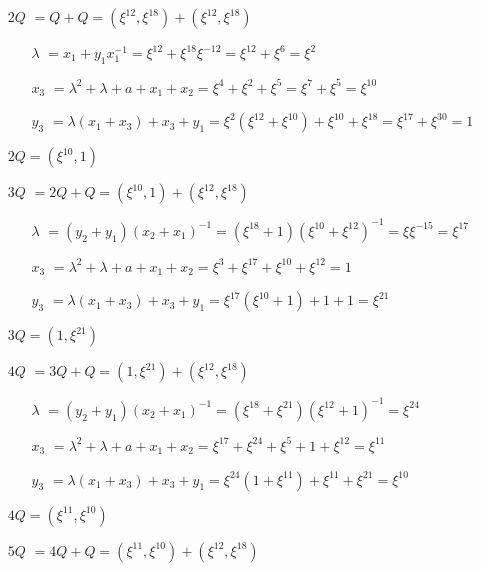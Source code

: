 \documentclass[fleqn]{article}
\begin{document}
    \begin{itemize}
        \item[$2Q$] $ = Q + Q = (\xi^{12}, \xi^{18}) + (\xi^{12}, \xi^{18})$
                    \begin{itemize}
                        \item[$\lambda$] $ = x_1 + y_1 x_1^{-1} = \xi^{12} + \xi^{18} \xi^{-12} = \xi^{12} + \xi^6 = \xi^{2}$
                        \item[$x_3$] $ = \lambda^2 + \lambda + a + x_1 + x_2 = \xi^4 + \xi^2 + \xi^{5} = \xi^{7} + \xi^{5} = \xi^{10}$
                        \item[$y_3$] $ = \lambda(x_1 + x_3) + x_3 + y_1 = \xi^{2} (\xi^{12} + \xi^{10}) + \xi^{10} + \xi^{18} = \xi^{17} + \xi^{30} = 1$
                    \end{itemize}
                    $2Q = (\xi^{10}, 1)$
        \item[$3Q$] $ = 2Q + Q = (\xi^{10}, 1) + (\xi^{12}, \xi^{18})$
                    \begin{itemize}
                        \item[$\lambda$] $ = (y_2 + y_1)(x_2 + x_1)^{-1} = (\xi^{18} + 1)(\xi^{10} + \xi^{12})^{-1} = \xi \xi^{-15} = \xi^{17}$
                        \item[$x_3$] $ = \lambda^2 + \lambda + a + x_1 + x_2 = \xi^{3} + \xi^{17} + \xi^{10} + \xi^{12} = 1$
                        \item[$y_3$] $ = \lambda(x_1 + x_3) + x_3 + y_1 = \xi^{17}(\xi^{10} + 1) + 1 + 1 = \xi^{21}$
                    \end{itemize}
                    $3Q = (1, \xi^{21})$
        \item[$4Q$] $ = 3Q + Q = (1, \xi^{21}) + (\xi^{12}, \xi^{18})$
            \begin{itemize}
                \item[$\lambda$] $ = (y_2 + y_1)(x_2 + x_1)^{-1} = (\xi^{18} + \xi^{21})(\xi^{12} + 1)^{-1} = \xi^{24}$
                \item[$x_3$] $ = \lambda^2 + \lambda + a + x_1 + x_2 = \xi^{17} + \xi^{24} + \xi^{5} + 1 + \xi^{12} = \xi^{11}$
                \item[$y_3$] $ = \lambda(x_1 + x_3) + x_3 + y_1 = \xi^{24} (1 + \xi^{11}) + \xi^{11} + \xi^{21} = \xi^{10}$
            \end{itemize}
            $4Q = (\xi^{11}, \xi^{10})$
        \item[$5Q$] $ = 4Q + Q = (\xi^{11}, \xi^{10}) + (\xi^{12}, \xi^{18})$

\end{itemize}
\end{document}
